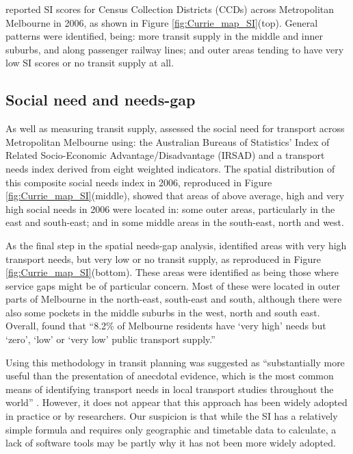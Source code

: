 \documentclass[preprint, 3p,
authoryear]{elsarticle} %
\begin{document}
\citet{currie2010identifying} reported SI scores for Census Collection
Districts (CCDs) across Metropolitan Melbourne in 2006, as shown in
Figure \ref{fig:Currie_map_SI}(top). General patterns were identified,
being: more transit supply in the middle and inner suburbs, and along
passenger railway lines; and outer areas tending to have very low SI
scores or no transit supply at all.

\subsection{Social need and needs-gap}\label{social-need-and-needs-gap}

As well as measuring transit supply, \citet{currie2010identifying}
assessed the social need for transport across Metropolitan Melbourne
using: the Australian Bureaus of Statistics' Index of Related
Socio-Economic Advantage/Disadvantage (IRSAD) and a transport needs
index derived from eight weighted indicators. The spatial distribution
of this composite social needs index in 2006, reproduced in Figure
\ref{fig:Currie_map_SI}(middle), showed that areas of above average,
high and very high social needs in 2006 were located in: some outer
areas, particularly in the east and south-east; and in some middle areas
in the south-east, north and west.

As the final step in the spatial needs-gap analysis,
\citet{currie2010identifying} identified areas with very high transport
needs, but very low or no transit supply, as reproduced in Figure
\ref{fig:Currie_map_SI}(bottom). These areas were identified as being
those where service gaps might be of particular concern. Most of these
were located in outer parts of Melbourne in the north-east, south-east
and south, although there were also some pockets in the middle suburbs
in the west, north and south east. Overall,
\citet{currie2010identifying} found that ``8.2\% of Melbourne residents
have `very high' needs but `zero', `low' or `very low' public transport
supply.''

Using this methodology in transit planning was suggested as
``substantially more useful than the presentation of anecdotal evidence,
which is the most common means of identifying transport needs in local
transport studies throughout the world'' \citep{currie2010identifying}.
However, it does not appear that this approach has been widely adopted
in practice or by researchers. Our suspicion is that while the SI has a
relatively simple formula and requires only geographic and timetable
data to calculate, a lack of software tools may be partly why it has not
been more widely adopted.
\end{document}
